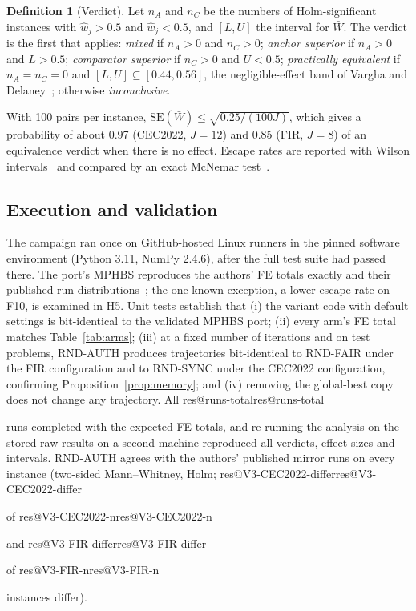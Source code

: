 \documentclass[11pt]{article}
\makeatletter
\theoremstyle{definition}
\newtheorem{definition}{Definition}
\theoremstyle{remark}
\renewcommand\res[1]{\ifcsname res@#1\endcsname\csname res@#1\endcsname\else\PackageError{res}{Undefined result key #1}{}\fi}
\makeatother
\begin{document}
\begin{definition}[Verdict]
\label{def:verdict}
Let $n_A$ and $n_C$ be the numbers of Holm-significant instances with $\hat w_j>0.5$ and $\hat w_j<0.5$, and $[L,U]$ the
interval for $\bar W$. The verdict is the first that applies: \emph{mixed} if $n_A>0$ and $n_C>0$; \emph{anchor superior}
if $n_A>0$ and $L>0.5$; \emph{comparator superior} if $n_C>0$ and $U<0.5$; \emph{practically equivalent} if $n_A=n_C=0$
and $[L,U]\subseteq[0.44,0.56]$, the negligible-effect band of Vargha and Delaney~\citep{vargha2000}; otherwise
\emph{inconclusive}.
\end{definition}

With 100 pairs per instance, $\mathrm{SE}(\bar W)\le\sqrt{0.25/(100J)}$, which gives a probability of about 0.97 (CEC2022,
$J=12$) and 0.85 (FIR, $J=8$) of an equivalence verdict when there is no effect. Escape rates are reported with Wilson
intervals~\citep{wilson1927} and compared by an exact McNemar test~\citep{mcnemar1947}.

\subsection{Execution and validation}
\label{sec:validation}
The campaign ran once on GitHub-hosted Linux runners in the pinned software environment (Python 3.11, NumPy 2.4.6),
after the full test suite had passed there. The port's MPHBS reproduces the authors' FE totals exactly and their
published run distributions~\citep{flores2026code}; the one known exception, a lower escape rate on F10, is examined in
H5. Unit tests establish that (i) the variant code with default settings is bit-identical to the validated MPHBS port;
(ii) every arm's FE total matches Table~\ref{tab:arms}; (iii) at a fixed number of iterations and on test problems,
RND-AUTH produces trajectories bit-identical to RND-FAIR under the FIR configuration and to RND-SYNC under the CEC2022
configuration, confirming Proposition~\ref{prop:memory}; and (iv) removing the global-best copy does not change any
trajectory. All \res{runs-total} runs completed with the expected FE totals, and re-running the analysis on the stored
raw results on a second machine reproduced all verdicts, effect sizes and intervals. RND-AUTH agrees with the authors'
published mirror runs on every instance (two-sided Mann--Whitney, Holm; \res{V3-CEC2022-differ} of \res{V3-CEC2022-n}
and \res{V3-FIR-differ} of \res{V3-FIR-n} instances differ).

\end{document}
